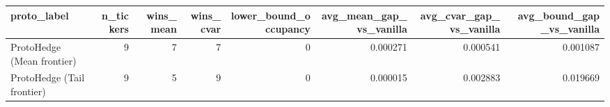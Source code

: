 \begin{tabular}{lrrrrrrr}
\toprule
proto_label & n_tickers & wins_mean & wins_cvar & lower_bound_occupancy & avg_mean_gap_vs_vanilla & avg_cvar_gap_vs_vanilla & avg_bound_gap_vs_vanilla \\
\midrule
ProtoHedge (Mean frontier) & 9 & 7 & 7 & 0 & 0.000271 & 0.000541 & 0.001087 \\
ProtoHedge (Tail frontier) & 9 & 5 & 9 & 0 & 0.000015 & 0.002883 & 0.019669 \\
\bottomrule
\end{tabular}
